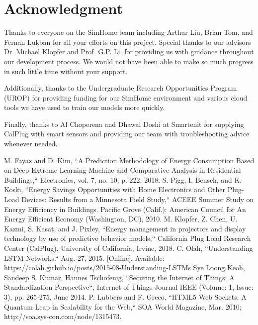 \documentclass[conference]{IEEEtran}
\begin{document}
\section*{Acknowledgment}
Thanks to everyone on the SimHome team including Arthur Liu, Brian Tom, and Fernan Lukban for all your efforts on this project. Special thanks to our advisors Dr. Michael Klopfer and Prof. G.P. Li. for providing us with guidance throughout our development process. We would not have been able to make so much progress in such little time without your support.

Additionally, thanks to the Undergraduate Research Opportunities Program (UROP) for providing funding for our SimHome environment and various cloud tools we have used to train our models more quickly.

Finally, thanks to Al Choperena and Dhawal Doshi at Smartenit for supplying CalPlug with smart sensors and providing our team with troubleshooting advice whenever needed.

\begin{thebibliography}{00}
 M. Fayaz and D. Kim, ``A Prediction Methodology of Energy Consumption Based on Deep Extreme Learning Machine and Comparative Analysis in Residential Buildings,`` Electronics, vol. 7, no. 10, p. 222, 2018.
 S. Pigg, I. Bensch, and K. Koski, ``Energy Savings Opportunities with Home Electronics and Other Plug-Load Devices: Results from a Minnesota Field Study,`` ACEEE Summer Study on Energy Efficiency in Buildings. Pacific Grove (Calif.): American Council for An Energy Efficient Economy (Washington, DC), 2010.
 M. Klopfer, Z. Chen, U. Kazmi, S. Kasat, and J. Pixley, ``Energy management in projectors and display technology by use of predictive behavior models,`` California Plug Load Research Center (CalPlug), University of California, Irvine, 2018.
 C. Olah, ``Understanding LSTM Networks.`` Aug. 27, 2015. [Online]. Available: https://colah.github.io/posts/2015-08-Understanding-LSTMs
 Sye Loong Keoh, Sandeep S. Kumar, Hannes Tschofenig, ``Securing the Internet of
Things: A Standardization Perspective``, Internet of Things Journal IEEE (Volume:
1, Issue: 3), pp. 265-275, June 2014.
 P. Lubbers and F. Greco, ``HTML5 Web Sockets: A Quantum Leap in Scalability for the Web,`` SOA World Magazine, Mar. 2010; http://soa.sys-con.com/node/1315473.
\end{thebibliography}

\end{document}
